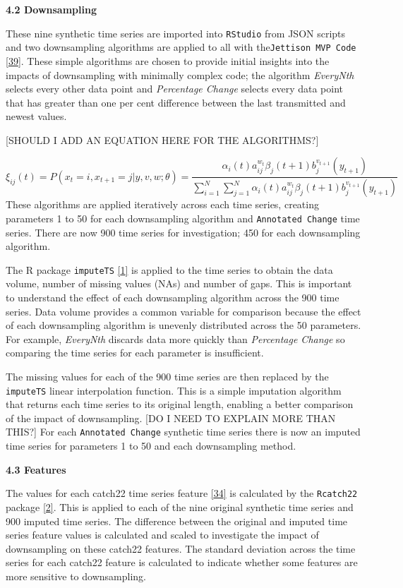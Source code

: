 \documentclass{article}
\begin{document}
\textbf{4.2 Downsampling}

These nine synthetic time series are imported into \texttt{RStudio} from
JSON scripts and two downsampling algorithms are applied to all with
the\texttt{Jettison\ MVP\ Code}
\protect\hyperlink{ref-Jettison}{{[}39{]}}. These simple algorithms are
chosen to provide initial insights into the impacts of downsampling with
minimally complex code; the algorithm \emph{EveryNth} selects every
other data point and \emph{Percentage Change} selects every data point
that has greater than one per cent difference between the last
transmitted and newest values.

{[}SHOULD I ADD AN EQUATION HERE FOR THE ALGORITHMS?{]}

\[
\xi _{ij}(t)=P(x_{t}=i,x_{t+1}=j|y,v,w;\theta)= {\frac {\alpha _{i}(t)a^{w_t}_{ij}\beta _{j}(t+1)b^{v_{t+1}}_{j}(y_{t+1})}{\sum _{i=1}^{N} \sum _{j=1}^{N} \alpha _{i}(t)a^{w_t}_{ij}\beta _{j}(t+1)b^{v_{t+1}}_{j}(y_{t+1})}}
\] These algorithms are applied iteratively across each time series,
creating parameters 1 to 50 for each downsampling algorithm and
\texttt{Annotated\ Change} time series. There are now 900 time series
for investigation; 450 for each downsampling algorithm.

The R package \texttt{imputeTS}
\protect\hyperlink{ref-imputeTS_R}{{[}1{]}} is applied to the time
series to obtain the data volume, number of missing values (NAs) and
number of gaps. This is important to understand the effect of each
downsampling algorithm across the 900 time series. Data volume provides
a common variable for comparison because the effect of each downsampling
algorithm is unevenly distributed across the 50 parameters. For example,
\emph{EveryNth} discards data more quickly than \emph{Percentage Change}
so comparing the time series for each parameter is insufficient.

The missing values for each of the 900 time series are then replaced by
the \texttt{imputeTS} linear interpolation function. This is a simple
imputation algorithm that returns each time series to its original
length, enabling a better comparison of the impact of downsampling.
{[}DO I NEED TO EXPLAIN MORE THAN THIS?{]} For each
\texttt{Annotated\ Change} synthetic time series there is now an imputed
time series for parameters 1 to 50 and each downsampling method.

\textbf{4.3 Features}

The values for each catch22 time series feature
\protect\hyperlink{ref-catch22}{{[}34{]}} is calculated by the
\texttt{Rcatch22} package \protect\hyperlink{ref-catch22_R}{{[}2{]}}.
This is applied to each of the nine original synthetic time series and
900 imputed time series. The difference between the original and imputed
time series feature values is calculated and scaled to investigate the
impact of downsampling on these catch22 features. The standard deviation
across the time series for each catch22 feature is calculated to
indicate whether some features are more sensitive to downsampling.
\end{document}
